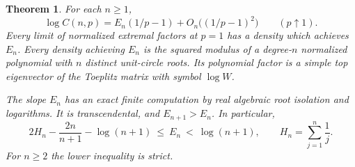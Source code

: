 \documentclass[11pt]{article}
\newtheorem{theorem}{Theorem}
\begin{document}
\begin{theorem}\label{thm:general-entropy}
For each \(n\geq1\),
\[
 \log C(n,p)=E_n(1/p-1)+O_n\bigl((1/p-1)^2\bigr)
 \qquad(p\uparrow1).
\]
Every limit of normalized extremal factors at \(p=1\) has a density
which achieves \(E_n\). Every density achieving \(E_n\) is the
squared modulus of a degree-\(n\) normalized polynomial with
\(n\) distinct unit-circle roots. Its polynomial factor is a
simple top eigenvector of the Toeplitz matrix with symbol \(\log W\).

The slope \(E_n\) has an exact finite computation by real
algebraic root isolation and logarithms. It is transcendental,
and \(E_{n+1}>E_n\). In particular,
\[
 2H_n-\frac{2n}{n+1}-\log(n+1)
 \ \leq\ E_n\ <\ \log(n+1),\qquad
 H_n=\sum_{j=1}^n\frac1j .
\]
For \(n\geq2\) the lower inequality is strict.
\end{theorem}
\end{document}
